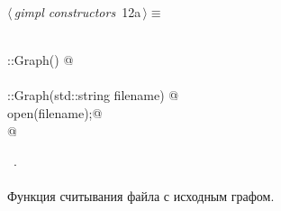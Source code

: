 \documentclass[12pt]{article}
\begin{document}
\begin{flushleft} \small
\begin{minipage}{\linewidth}\label{scrap22}\raggedright\small
{} $\langle\,${\itshape gimpl constructors}\nobreak\ {\footnotesize {12a}}$\,\rangle\equiv$
\vspace{-1ex}
\begin{list}{}{} \item
\mbox{}\verb@@\\
\mbox{}\verb@Graph::Graph() { }@\\
\mbox{}\verb@@\\
\mbox{}\verb@Graph::Graph(std::string filename) {@\\
\mbox{}\verb@    open(filename);@\\
\mbox{}\verb@} @\\
\mbox{}\verb@@{\NWsep}
\end{list}
\vspace{-1.5ex}
\footnotesize
\begin{list}{}{\setlength{\itemsep}{-\parsep}\setlength{\itemindent}{-\leftmargin}}
\item \NWtxtMacroRefIn\ .

\item{}
\end{list}
\end{minipage}\vspace{4ex}
\end{flushleft}
\paragraph{}
Функция считывания файла с исходным графом.
\end{document}
